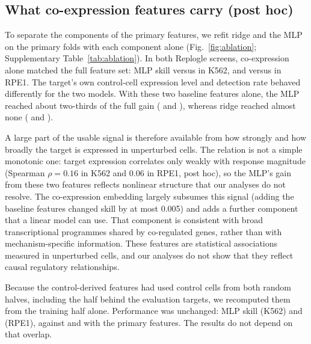 \subsection{What co-expression features carry (post hoc)}
To separate the components of the primary features, we refit ridge and the MLP on the primary folds with each component alone (Fig.~\ref{fig:ablation}; Supplementary Table~\ref{tab:ablation}). In both Replogle screens, co-expression alone matched the full feature set: MLP skill \numAblReplogleKEssentialMlpEnsembleCoexpressionOnly{} versus \numAblReplogleKEssentialMlpEnsembleFull{} in K562, and \numAblReplogleRpeMlpEnsembleCoexpressionOnly{} versus \numAblReplogleRpeMlpEnsembleFull{} in RPE1. The target's own control-cell expression level and detection rate behaved differently for the two models. With these two baseline features alone, the MLP reached about two-thirds of the full gain (\numAblReplogleKEssentialMlpEnsembleBaselineBoth{} and \numAblReplogleRpeMlpEnsembleBaselineBoth), whereas ridge reached almost none (\numAblReplogleKEssentialRidgeBaselineBoth{} and \numAblReplogleRpeRidgeBaselineBoth).

A large part of the usable signal is therefore available from how strongly and how broadly the target is expressed in unperturbed cells. The relation is not a simple monotonic one: target expression correlates only weakly with response magnitude (Spearman $\rho=0.16$ in K562 and $0.06$ in RPE1, post hoc), so the MLP's gain from these two features reflects nonlinear structure that our analyses do not resolve. The co-expression embedding largely subsumes this signal (adding the baseline features changed skill by at most 0.005) and adds a further component that a linear model can use. That component is consistent with broad transcriptional programmes shared by co-regulated genes, rather than with mechanism-specific information. These features are statistical associations measured in unperturbed cells, and our analyses do not show that they reflect causal regulatory relationships.

Because the control-derived features had used control cells from both random halves, including the half behind the evaluation targets, we recomputed them from the training half alone. Performance was unchanged: MLP skill \numAblReplogleKEssentialMlpEnsembleFullSplit{} (K562) and \numAblReplogleRpeMlpEnsembleFullSplit{} (RPE1), against \numAblReplogleKEssentialMlpEnsembleFull{} and \numAblReplogleRpeMlpEnsembleFull{} with the primary features. The results do not depend on that overlap.

